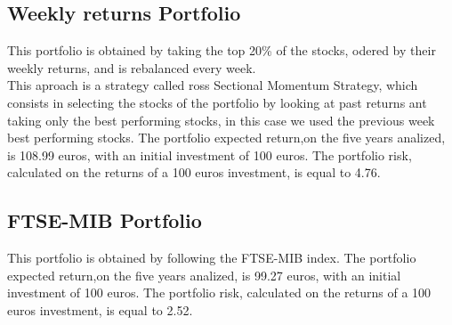 \documentclass[12pt, a4paper, twocolumn]{article} %
\begin{document}
	\subsection{Weekly returns Portfolio}
	This portfolio is obtained by taking the top 20\% of the stocks, odered by their weekly returns, and is rebalanced every week.\\
	This aproach is a strategy called ross Sectional Momentum Strategy, which consists in selecting the stocks of the portfolio by looking at past returns ant taking only the best performing stocks, in this case we used the previous week best performing stocks.
	The portfolio expected return,on the five years analized, is 108.99 euros, with an initial investment of 100 euros. The portfolio risk, calculated on the returns of a 100 euros investment, is equal to 4.76.
	\subsection{FTSE-MIB Portfolio}
	This portfolio is obtained by following the FTSE-MIB index.
	The portfolio expected return,on the five years analized, is 99.27 euros, with an initial investment of 100 euros. The portfolio risk, calculated on the returns of a 100 euros investment, is equal to 2.52.
	
	
	
\end{document}
